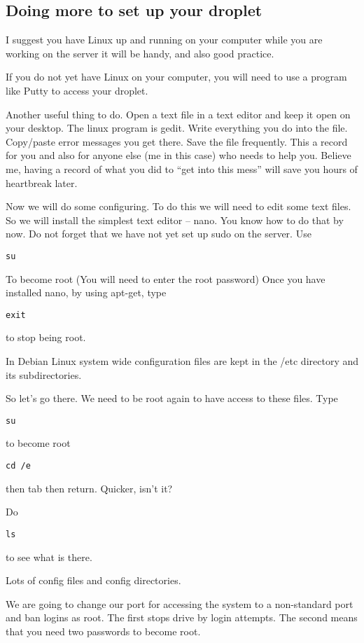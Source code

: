 \documentclass[12pt,a4paper]{article}
\begin{document}
\subsection*{Doing more to set up your droplet}


I suggest you have Linux up and running on your computer while you are working on the server  it will be handy, and also good practice.

If you do not yet have Linux on your computer, you will need to use a program like Putty to access your droplet.

Another useful thing to do. Open a text file in a text editor and keep it open on your desktop. The linux program is gedit. Write everything you do into the file. Copy/paste error messages you get there. Save the file frequently. This a record for you and also for anyone else (me in this case) who needs to help you. Believe me, having a record of what you did to “get into this mess” will save you hours of heartbreak later. 

Now we will do some configuring. To do this we will need to edit some text files. So we will install the simplest text editor – nano. You know how to do that by now. Do not forget that we have not yet set up sudo on the server.
Use
\begin{lstlisting}
su
\end{lstlisting}
To become root
(You will need to enter the root password)
Once you have installed nano, by using apt-get, type
\begin{lstlisting}
exit
\end{lstlisting}
to stop being root.

In Debian Linux system wide configuration files are kept in the /etc directory and its subdirectories.

So let's go there. We need to be root again to have access to these files. Type
\begin{lstlisting}
su
\end{lstlisting}
to become root
\begin{lstlisting}
cd /e 
\end{lstlisting}
then tab then return. Quicker, isn’t it?

Do 
\begin{lstlisting}
ls
\end{lstlisting}

to see what is there. 

Lots of config files and config directories.

We are going to change our port for accessing the system to a non-standard port and ban logins as root. The first stops drive by login attempts. The second means that you need two passwords to become root.
\end{document}
